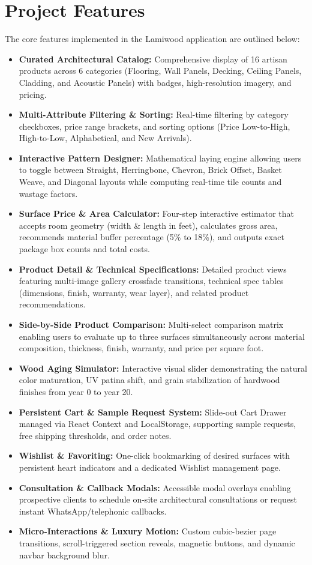 \documentclass[12pt,a4paper]{report}
\begin{document}
\section{Project Features}
The core features implemented in the Lamiwood application are outlined below:
\begin{itemize}
    \item \textbf{Curated Architectural Catalog:} Comprehensive display of 16 artisan products across 6 categories (Flooring, Wall Panels, Decking, Ceiling Panels, Cladding, and Acoustic Panels) with badges, high-resolution imagery, and pricing.
    \item \textbf{Multi-Attribute Filtering \& Sorting:} Real-time filtering by category checkboxes, price range brackets, and sorting options (Price Low-to-High, High-to-Low, Alphabetical, and New Arrivals).
    \item \textbf{Interactive Pattern Designer:} Mathematical laying engine allowing users to toggle between Straight, Herringbone, Chevron, Brick Offset, Basket Weave, and Diagonal layouts while computing real-time tile counts and wastage factors.
    \item \textbf{Surface Price \& Area Calculator:} Four-step interactive estimator that accepts room geometry (width \& length in feet), calculates gross area, recommends material buffer percentage (5\% to 18\%), and outputs exact package box counts and total costs.
    \item \textbf{Product Detail \& Technical Specifications:} Detailed product views featuring multi-image gallery crossfade transitions, technical spec tables (dimensions, finish, warranty, wear layer), and related product recommendations.
    \item \textbf{Side-by-Side Product Comparison:} Multi-select comparison matrix enabling users to evaluate up to three surfaces simultaneously across material composition, thickness, finish, warranty, and price per square foot.
    \item \textbf{Wood Aging Simulator:} Interactive visual slider demonstrating the natural color maturation, UV patina shift, and grain stabilization of hardwood finishes from year 0 to year 20.
    \item \textbf{Persistent Cart \& Sample Request System:} Slide-out Cart Drawer managed via React Context and LocalStorage, supporting sample requests, free shipping thresholds, and order notes.
    \item \textbf{Wishlist \& Favoriting:} One-click bookmarking of desired surfaces with persistent heart indicators and a dedicated Wishlist management page.
    \item \textbf{Consultation \& Callback Modals:} Accessible modal overlays enabling prospective clients to schedule on-site architectural consultations or request instant WhatsApp/telephonic callbacks.
    \item \textbf{Micro-Interactions \& Luxury Motion:} Custom cubic-bezier page transitions, scroll-triggered section reveals, magnetic buttons, and dynamic navbar background blur.
\end{itemize}
\end{document}
